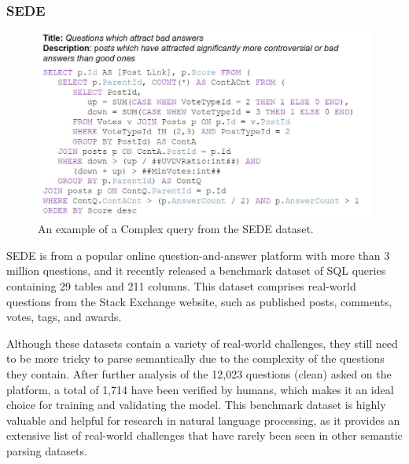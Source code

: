 \subsubsection{SEDE}

\begin{figure}[H]
    \centering
    \includegraphics[width=0.8\linewidth]{pics/sede_sql.jpg}
    \caption{An example of a Complex query from the SEDE dataset.\cite{DBLP:journals/corr/abs-2106-05006}}
    \label{fig:sede_sql}
\end{figure}

\ac{SEDE} \cite{DBLP:journals/corr/abs-2106-05006} is from a popular online question-and-answer platform with more than 3 million questions, and it recently released a benchmark dataset of SQL queries containing 29 tables and 211 columns. This dataset comprises real-world questions from the Stack Exchange website, such as published posts, comments, votes, tags, and awards.

Although these datasets contain a variety of real-world challenges, they still need to be more tricky to parse semantically due to the complexity of the questions they contain. After further analysis of the 12,023 questions (clean) asked on the platform, a total of 1,714 have been verified by humans, which makes it an ideal choice for training and validating the model. This benchmark dataset is highly valuable and helpful for research in natural language processing, as it provides an extensive list of real-world challenges that have rarely been seen in other semantic parsing datasets.